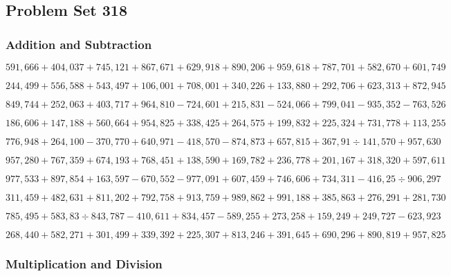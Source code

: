\hypertarget{problem-set-318}{%
\subsection{Problem Set 318}\label{problem-set-318}}

\hypertarget{addition-and-subtraction}{%
\subsubsection{Addition and
Subtraction}\label{addition-and-subtraction}}

\(591,666+404,037+745,121+867,671+629,918+890,206+959,618+787,701+582,670+601,749\)

\(244,499+556,588+543,497+106,001+708,001+340,226+133,880+292,706+623,313+872,945\)

\(849,744+252,063+403,717+964,810-724,601+215,831-524,066+799,041-935,352-763,526\)

\(186,606+147,188+560,664+954,825+338,425+264,575+199,832+225,324+731,778+113,255\)

\(776,948+264,100-370,770+640,971-418,570-874,873+657,815+367,91÷141,570+957,630\)

\(957,280+767,359+674,193+768,451+138,590+169,782+236,778+201,167+318,320+597,611\)

\(977,533+897,854+163,597-670,552-977,091+607,459+746,606+734,311-416,25÷906,297\)

\(311,459+482,631+811,202+792,758+913,759+989,862+991,188+385,863+276,291+281,730\)

\(785,495+583,83÷843,787-410,611+834,457-589,255+273,258+159,249+249,727-623,923\)

\(268,440+582,271+301,499+339,392+225,307+813,246+391,645+690,296+890,819+957,825\)

\hypertarget{multiplication-and-division}{%
\subsubsection{Multiplication and
Division}\label{multiplication-and-division}}

